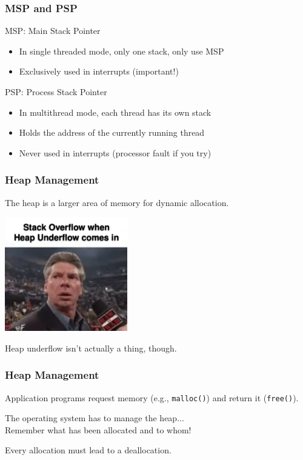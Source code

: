 \begin{frame}
\frametitle{MSP and PSP}

MSP: \alert{Main Stack Pointer}\vspace{-4em}
\begin{itemize}
\item In single threaded mode, only one stack, only use MSP
\item Exclusively used in interrupts (important!)
\end{itemize}


PSP: \alert{Process Stack Pointer}\vspace{-4em}
\begin{itemize}
\item In multithread mode, each thread has its own stack
\item Holds the address of the currently running thread
\item Never used in interrupts (processor fault if you try)
\end{itemize}

\end{frame}

\begin{frame}
\frametitle{Heap Management}

The heap is a larger area of memory for dynamic allocation.

\begin{center}
  \includegraphics[width=0.4\textwidth]{images/heapunderflow.png}
\end{center}

Heap underflow isn't actually a thing, though.

\end{frame}

\begin{frame}
\frametitle{Heap Management}

Application programs request memory (e.g., \texttt{malloc()}) and return it (\texttt{free()}).

The operating system has to manage the heap...\\ 
\quad Remember what has been allocated and to whom!

Every allocation must lead to a deallocation.

\end{frame}

